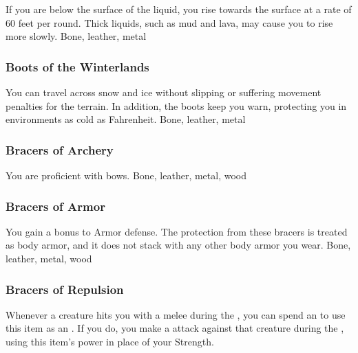 If you are below the surface of the liquid, you rise towards the surface at a rate of 60 feet per round.
Thick liquids, such as mud and lava, may cause you to rise more slowly.
 
 Bone, leather, metal
\lowercase{\hypertarget{item:Boots of the Winterlands}{}}\label{item:Boots of the Winterlands}
\hypertarget{item:Boots of the Winterlands}{\subsubsection{Boots of the Winterlands\hfill{}}}
You can travel across snow and ice without slipping or suffering movement penalties for the terrain.
In addition, the boots keep you warn, protecting you in environments as cold as  Fahrenheit.
 
 Bone, leather, metal
\lowercase{\hypertarget{item:Bracers of Archery}{}}\label{item:Bracers of Archery}
\hypertarget{item:Bracers of Archery}{\subsubsection{Bracers of Archery\hfill{}}}
You are proficient with bows.
 
 Bone, leather, metal, wood
\lowercase{\hypertarget{item:Bracers of Armor}{}}\label{item:Bracers of Armor}
\hypertarget{item:Bracers of Armor}{\subsubsection{Bracers of Armor\hfill{}}}
You gain a  bonus to Armor defense.
The protection from these bracers is treated as body armor, and it does not stack with any other body armor you wear.
 
 Bone, leather, metal, wood
\lowercase{\hypertarget{item:Bracers of Repulsion}{}}\label{item:Bracers of Repulsion}
\hypertarget{item:Bracers of Repulsion}{\subsubsection{Bracers of Repulsion\hfill{}}}
Whenever a creature hits you with a melee  during the ,
you can spend an  to use this item as an .
If you do, you make a  attack against that creature during the , using this item's power in place of your Strength.
